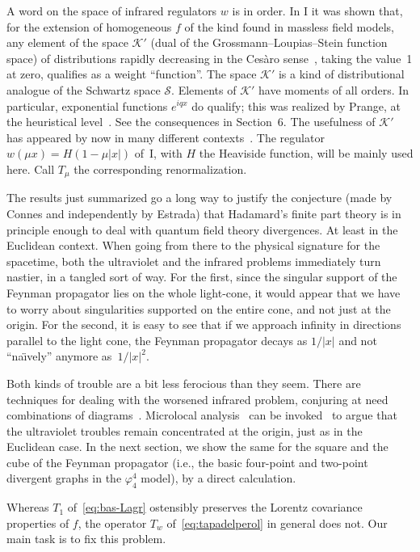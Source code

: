 \documentclass[a4paper,12pt]{article}
\newcommand{\K}{\mathcal{K}}       %
\renewcommand{\SS}{\mathcal{S}}    %
\newcommand{\7}{\dagger}           %
\theoremstyle{plain}
\theoremstyle{definition}
\begin{document}
A word on the space of infrared regulators $w$ is in order. In I it
was shown that, for the extension of homogeneous $f$ of the kind found
in massless field models, any element of the space $\K'$ (dual of the
Grossmann--Loupias--Stein function space) of distributions rapidly
decreasing in the Ces\`aro sense~\cite{Odysseus}, taking the value~1
at zero, qualifies as a weight ``function''. The space $\K'$ is a kind
of distributional analogue of the Schwartz space $\SS$. Elements of
$\K'$ have moments of all orders. In particular, exponential functions
$e^{iqx}$ do qualify; this was realized by Prange, at the heuristical
level~\cite{PrangeA}. See the consequences in Section~6. The
usefulness of $\K'$ has appeared by now in many different
contexts~\cite{Hungarian}. The regulator $w(\mu x) = H(1-\mu|x|)$
of~I, with $H$ the Heaviside function, will be mainly used here. Call
$T_\mu$ the corresponding renormalization.

The results just summarized go a long way to justify the conjecture
(made by Connes and independently by Estrada) that Hadamard's finite
part theory is in principle enough to deal with quantum field theory
divergences. At least in the Euclidean context. When going from there
to the physical signature for the spacetime, both the ultraviolet and
the infrared problems immediately turn nastier, in a tangled sort of
way. For the first, since the singular support of the Feynman
propagator lies on the whole light-cone, it would appear that we have
to worry about singularities supported on the entire cone, and not
just at the origin. For the second, it is easy to see that if we
approach infinity in directions parallel to the light cone, the
Feynman propagator decays as $1/|x|$ and not ``na\"{\i}vely'' anymore
as~$1/|x|^2$.

Both kinds of trouble are a bit less ferocious than they seem. There
are techniques for dealing with the worsened infrared problem,
conjuring at need combinations of diagrams~\cite{OSphi}. Microlocal
analysis~\cite[Sec.~8.2]{Hoermander} can be invoked~\cite{Gudrun} to
argue that the ultraviolet troubles remain concentrated at the origin,
just as in the Euclidean case. In the next section, we show the same
for the square and the cube of the Feynman propagator (i.e., the basic
four-point and two-point divergent graphs in the $\varphi^4_4$ model),
by a direct calculation.

Whereas $T_1$ of~\eqref{eq:bas-Lagr} ostensibly preserves the Lorentz
covariance properties of $f$, the operator $T_w$
of~\eqref{eq:tapadelperol} in general does not. Our main task is to
fix this problem.
\end{document}
